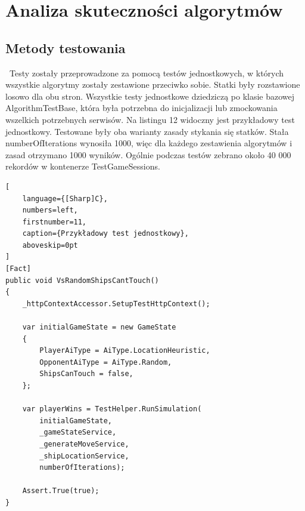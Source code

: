 \newpage %
\section{Analiza skuteczności algorytmów}

\subsection{Metody testowania}
\indent\ Testy zostały przeprowadzone za pomocą testów jednostkowych, w których wszystkie algorytmy zostały zestawione przeciwko sobie. Statki były rozstawione losowo dla obu stron. Wszystkie testy jednostkowe dziedziczą po klasie bazowej AlgorithmTestBase, która była potrzebna do inicjalizacji lub zmockowania wszelkich potrzebnych serwisów. Na listingu 12 widoczny jest przykładowy test jednostkowy. Testowane były oba warianty zasady stykania się statków. Stała numberOfIterations wynosiła 1000, więc dla każdego zestawienia algorytmów i zasad otrzymano 1000 wyników. Ogólnie podczas testów zebrano około 40 000 rekordów w kontenerze TestGameSessions.

\begin{addmargin}[10mm]{0mm}
\begin{lstlisting}[
    language={[Sharp]C},
    numbers=left,
    firstnumber=11,
    caption={Przykładowy test jednostkowy},
    aboveskip=0pt
]
[Fact]
public void VsRandomShipsCantTouch()
{
    _httpContextAccessor.SetupTestHttpContext();

    var initialGameState = new GameState
    {
        PlayerAiType = AiType.LocationHeuristic,
        OpponentAiType = AiType.Random,
        ShipsCanTouch = false,
    };

    var playerWins = TestHelper.RunSimulation(
        initialGameState,
        _gameStateService,
        _generateMoveService,
        _shipLocationService,
        numberOfIterations);

    Assert.True(true);
}
\end{lstlisting}
\end{addmargin}


